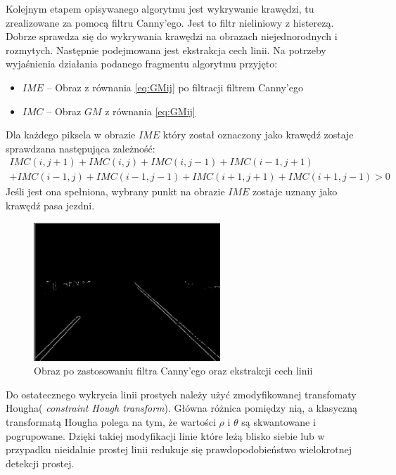 Kolejnym etapem opisywanego algorytmu jest wykrywanie krawędzi, tu zrealizowane za pomocą filtru Canny'ego. Jest to filtr nieliniowy z histerezą. Dobrze sprawdza się do wykrywania krawędzi na obrazach niejednorodnych i rozmytych. Następnie podejmowana jest ekstrakcja cech linii. Na potrzeby wyjaśnienia działania podanego fragmentu algorytmu przyjęto:
\begin{itemize}
\item $IME$ -- Obraz z równania \eqref{eq:GMij} po filtracji filtrem Canny'ego
\item $IMC$ -- Obraz $GM$ z równania \eqref{eq:GMij}
\end{itemize}

Dla każdego piksela w obrazie $IME$ który został oznaczony jako krawędź zostaje sprawdzana następująca zależność:
\begin{equation}
	\begin{matrix}
	IMC(i,j+1)+IMC(i,j)+IMC(i,j-1)+IMC(i-1,j+1)\\
	+IMC(i-1,j)+IMC(i-1,j-1)+IMC(i+1,j+1)+IMC(i+1,j-1)>0
	\end{matrix}
\end{equation}
Jeśli jest ona spełniona, wybrany punkt na obrazie $IME$ zostaje uznany jako krawędź pasa jezdni.

\begin{figure}
  \centering
  \includegraphics[width=7cm]{img/canny.png}
  \caption{Obraz po zastosowaniu filtra Canny'ego oraz ekstrakcji cech linii\cite{T3}}
  \label{fig:canny}
\end{figure}

Do ostatecznego wykrycia linii prostych należy użyć zmodyfikowanej transfomaty Hougha( \textit{constraint Hough transform}). Główna różnica pomiędzy nią, a klasyczną transformatą Hougha polega na tym, że wartości $\rho$ i $\theta$ są skwantowane i pogrupowane. Dzięki takiej modyfikacji linie które leżą blisko siebie lub w przypadku nieidalnie prostej linii redukuje się prawdopodobieństwo wielokrotnej detekcji prostej.

